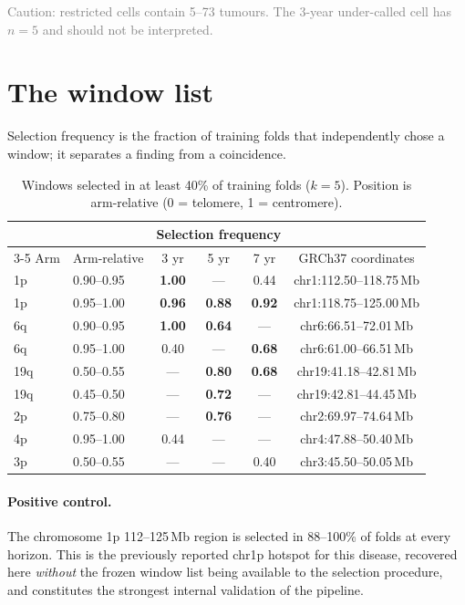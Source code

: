 \documentclass[11pt]{article}
\newcommand{\note}[1]{\textcolor{gray}{\small #1}}
\begin{document}
\note{Caution: restricted cells contain 5--73 tumours. The 3-year under-called
cell has $n=5$ and should not be interpreted.}

\section{The window list}

Selection frequency is the fraction of training folds that independently chose a
window; it separates a finding from a coincidence.

\begin{table}[H]
\centering
\caption{Windows selected in at least 40\% of training folds ($k=5$). Position
is arm-relative (0 = telomere, 1 = centromere).}
\label{tab:windows}
\begin{tabular}{llcccc}
\toprule
& & \multicolumn{3}{c}{Selection frequency} & \\
\cmidrule(lr){3-5}
Arm & Arm-relative & 3 yr & 5 yr & 7 yr & GRCh37 coordinates \\
\midrule
1p  & 0.90--0.95 & \textbf{1.00} & --- & 0.44 & chr1:112.50--118.75\,Mb \\
1p  & 0.95--1.00 & \textbf{0.96} & \textbf{0.88} & \textbf{0.92} & chr1:118.75--125.00\,Mb \\
6q  & 0.90--0.95 & \textbf{1.00} & \textbf{0.64} & --- & chr6:66.51--72.01\,Mb \\
6q  & 0.95--1.00 & 0.40 & --- & \textbf{0.68} & chr6:61.00--66.51\,Mb \\
19q & 0.50--0.55 & --- & \textbf{0.80} & \textbf{0.68} & chr19:41.18--42.81\,Mb \\
19q & 0.45--0.50 & --- & \textbf{0.72} & --- & chr19:42.81--44.45\,Mb \\
2p  & 0.75--0.80 & --- & \textbf{0.76} & --- & chr2:69.97--74.64\,Mb \\
4p  & 0.95--1.00 & 0.44 & --- & --- & chr4:47.88--50.40\,Mb \\
3p  & 0.50--0.55 & --- & --- & 0.40 & chr3:45.50--50.05\,Mb \\
\bottomrule
\end{tabular}
\end{table}

\paragraph{Positive control.}
The chromosome 1p 112--125\,Mb region is selected in 88--100\% of folds at every
horizon. This is the previously reported chr1p hotspot for this disease,
recovered here \emph{without} the frozen window list being available to the
selection procedure, and constitutes the strongest internal validation of the
pipeline.
\end{document}
